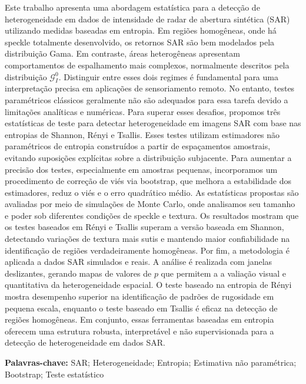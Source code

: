

Este trabalho apresenta uma abordagem estatística para a detecção de heterogeneidade 
em dados de intensidade de radar de abertura sintética (SAR) utilizando medidas 
baseadas em entropia. Em regiões homogêneas, onde há speckle totalmente desenvolvido, 
os retornos SAR são bem modelados pela distribuição Gama. Em contraste, áreas heterogêneas 
apresentam comportamentos de espalhamento mais complexos, normalmente descritos pela 
distribuição $\mathcal{G}_I^0$. Distinguir entre esses dois regimes é fundamental 
para uma interpretação precisa em aplicações de sensoriamento remoto. No entanto, 
testes paramétricos clássicos geralmente não são adequados para essa tarefa devido a 
limitações analíticas e numéricas.
Para superar esses desafios, propomos três estatísticas de teste para detectar heterogeneidade 
em imagens SAR com base nas entropias de Shannon, Rényi e Tsallis. Esses testes utilizam 
estimadores não paramétricos de entropia construídos a partir de espaçamentos amostrais, 
evitando suposições explícitas sobre a distribuição subjacente. Para aumentar a precisão dos testes, 
especialmente em amostras pequenas, incorporamos um procedimento de correção de viés via bootstrap, 
que melhora a estabilidade dos estimadores, reduz o viés e o erro quadrático médio.
As estatísticas propostas são avaliadas por meio de simulações de Monte Carlo, 
onde analisamos seu tamanho e poder sob diferentes condições de speckle e textura. 
Os resultados mostram que os testes baseados em Rényi e Tsallis superam a versão baseada 
em Shannon, detectando variações de textura mais sutis e mantendo maior confiabilidade na 
identificação de regiões verdadeiramente homogêneas.
Por fim, a metodologia é aplicada a dados SAR simulados e reais. 
A análise é realizada com janelas deslizantes, gerando mapas de valores de $p$ que permitem a a
valiação visual e quantitativa da heterogeneidade espacial. O teste baseado na entropia de 
Rényi mostra desempenho superior na identificação de padrões de rugosidade em pequena escala, 
enquanto o teste baseado em Tsallis é eficaz na detecção de regiões homogêneas. Em conjunto, 
essas ferramentas baseadas em entropia oferecem uma estrutura robusta, interpretável e não 
supervisionada para a detecção de heterogeneidade em dados SAR.

\vspace{1em}
\par
\noindent \textbf{Palavras-chave:} SAR; Heterogeneidade; Entropia; Estimativa não paramétrica; Bootstrap; Teste estatístico